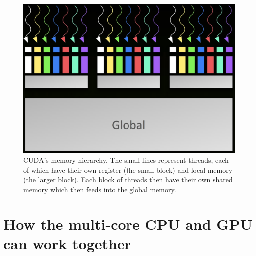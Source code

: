 \documentclass[a4paper,11pt]{article}
\begin{document}
\begin{figure}[ht]
  \centering
  \includegraphics[scale=0.3]{img/cuda-mem}
  \caption{CUDA's memory hierarchy. The small lines represent threads, each of which have their own register (the small
  block) and local memory (the larger block). Each block of threads then have their own shared memory which then feeds
  into the global memory.~\cite{slides:KhronosOpenCLOverview}}
\label{fig:cuda-mem}
\end{figure}





\newpage

\section{How the multi-core CPU and GPU can work together} %
\label{sec:parallelism_in_the_multi_core_cpu_and_gpu}
\end{document}
